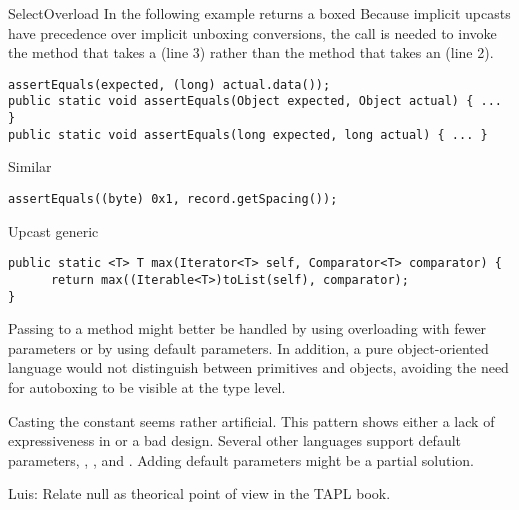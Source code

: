 \begin{pattern}{SelectOverload}
In the following example%
\def\urlvar{http://bit.ly/spullara_redis_protocol_2FC9Llb}
 returns a boxed 
Because implicit upcasts have precedence over implicit unboxing conversions,
the call is needed to invoke the method that takes a 
  (line 3)
  rather than the method that takes an  (line 2).
%
\begin{verbatim}
assertEquals(expected, (long) actual.data());
public static void assertEquals(Object expected, Object actual) { ... }
public static void assertEquals(long expected, long actual) { ... }
\end{verbatim}


Similar%
\def\urlvar{http://bit.ly/apache_poi_2StrlOn}

\begin{verbatim}
assertEquals((byte) 0x1, record.getSpacing());
\end{verbatim}

Upcast generic%
\def\urlvar{http://bit.ly/groovy_groovy_core_2HDAkbF}

\begin{verbatim}
public static <T> T max(Iterator<T> self, Comparator<T> comparator) {
      return max((Iterable<T>)toList(self), comparator);
}
\end{verbatim}

\discussion{}
  Passing  to a method might better be handled by using overloading
  with fewer parameters or by using default parameters.
  In addition, a pure object-oriented language would not distinguish between primitives and 
  objects, avoiding the need for autoboxing to be visible at the type level.

Casting the  constant seems rather artificial.
This pattern shows either a lack of expressiveness in \java{} or
a bad \api{} design.
Several other languages support default parameters, \eg{},
\scala{}, \csharp{} and \cpp{}.
Adding default parameters might be a partial solution.

Luis: Relate null as theorical point of view in the TAPL book.

\end{pattern}